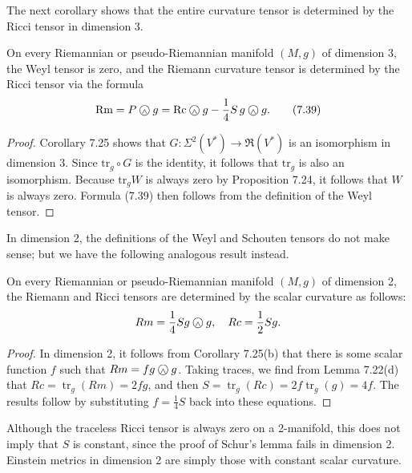 The next corollary shows that the entire curvature tensor is determined by the Ricci tensor in dimension 3.

\begin{corollary}
\label{cor:ricci-determines-curvature-dim3}
On every Riemannian or pseudo-Riemannian manifold $(M, g)$ of dimension 3, the Weyl tensor is zero, and the Riemann curvature tensor is determined by the Ricci tensor via the formula
\begin{equation}
\text{Rm} = P \owedge g = \text{Rc} \owedge g - \frac{1}{4} S \, g \owedge g. \tag{7.39}
\end{equation}
\end{corollary}

\begin{proof}
Corollary 7.25 shows that $G: \Sigma^2(V^*) \to \mathfrak{R}(V^*)$ is an isomorphism in dimension 3. Since $\text{tr}_g \circ G$ is the identity, it follows that $\text{tr}_g$ is also an isomorphism. Because $\text{tr}_g W$ is always zero by Proposition 7.24, it follows that $W$ is always zero. Formula (7.39) then follows from the definition of the Weyl tensor.
\end{proof}

In dimension 2, the definitions of the Weyl and Schouten tensors do not make sense; but we have the following analogous result instead.

\begin{corollary}
\label{cor:curvature-tensor-dim-2}
On every Riemannian or pseudo-Riemannian manifold $(M,g)$ of dimension 2, the Riemann and Ricci tensors are determined by the scalar curvature as follows:
\[
Rm = \frac{1}{4}Sg \owedge g, \quad Rc = \frac{1}{2}Sg.
\]
\end{corollary}

\begin{proof}
In dimension 2, it follows from Corollary 7.25(b) that there is some scalar function $f$ such that $Rm = fg \owedge g$. Taking traces, we find from Lemma 7.22(d) that $Rc = \operatorname{tr}_g(Rm) = 2fg$, and then $S = \operatorname{tr}_g(Rc) = 2f\operatorname{tr}_g(g) = 4f$. The results follow by substituting $f = \frac{1}{4}S$ back into these equations.
\end{proof}

Although the traceless Ricci tensor is always zero on a 2-manifold, this does not imply that $S$ is constant, since the proof of Schur's lemma fails in dimension 2. Einstein metrics in dimension 2 are simply those with constant scalar curvature.

